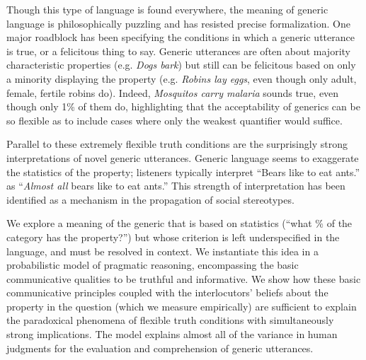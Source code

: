 \documentclass[11pt,letterpaper]{letter} %
\begin{document}
\begin{letter}
Though this type of language is found everywhere, the meaning of generic language is philosophically puzzling and has resisted precise formalization. 
One major roadblock has been specifying the conditions in which a generic utterance is true, or a felicitous thing to say.
Generic utterances are often about majority characteristic properties (e.g. \emph{Dogs bark}) but still can be felicitous based on only a minority displaying the property (e.g. \emph{Robins lay eggs}, even though only adult, female, fertile robins do). 
Indeed, \emph{Mosquitos carry malaria} sounds true, even though only 1\% of them do, highlighting that the acceptability of generics can be so flexible as to include cases where only the weakest quantifier would suffice. 

Parallel to these extremely flexible truth conditions are the surprisingly strong interpretations of novel generic utterances.
Generic language seems to exaggerate the statistics of the property; listeners typically interpret ``Bears like to eat ants.'' as ``\emph{Almost all} bears like to eat ants.''
This strength of interpretation has been identified as a mechanism in the propagation of social stereotypes. 


% 

We explore a meaning of the generic that is based on statistics (``what \% of the category has the property?'') but 
whose criterion is left underspecified in the language, and must be resolved in context.
We instantiate this idea in a probabilistic model of pragmatic reasoning, encompassing the basic communicative qualities to be truthful and informative. 
We show how these basic communicative principles coupled with the interlocutors' beliefs about the property in the question (which we measure empirically) are sufficient to explain the paradoxical phenomena of flexible truth conditions with simultaneously strong implications.
The model explains almost all of the variance in human judgments for the evaluation and comprehension of generic utterances.


\end{letter}
\end{document}
